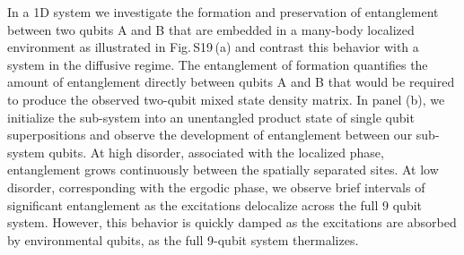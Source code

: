 In a 1D system we investigate the formation and preservation of entanglement between two qubits A and B that are embedded in a many-body localized environment as illustrated in Fig.\,S19\,(a) and contrast this behavior with a system in the diffusive regime.
The entanglement of formation quantifies the amount of entanglement directly between qubits A and B that would be required to produce the observed two-qubit mixed state density matrix.%
In panel (b), we initialize the sub-system into an unentangled product state of single qubit superpositions and observe the development of entanglement between our sub-system qubits.
At high disorder, associated with the localized phase, entanglement grows continuously between the spatially separated sites.
At low disorder, corresponding with the ergodic phase, we observe brief intervals of significant entanglement as the excitations delocalize across the full 9 qubit system.
However, this behavior is quickly damped as the excitations are absorbed by environmental qubits, as the full 9-qubit system thermalizes.

